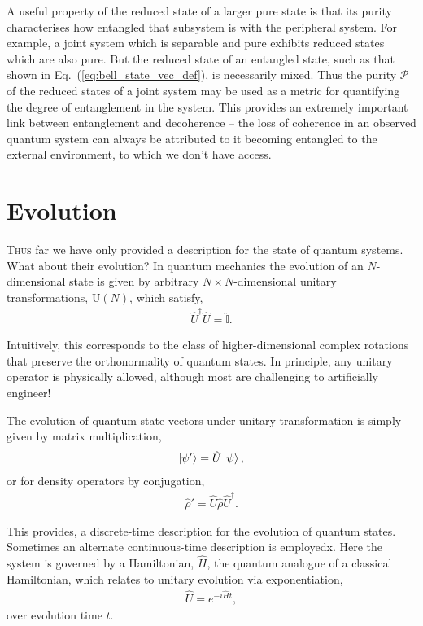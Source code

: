 \documentclass[aps,pra,twocolumn,amsmath,amssymb,nofootinbib,superscriptaddress]{revtex4}
\newcommand{\dropcap}[2]{\lettrine[lines=2, findent=3pt, nindent=0pt]{#1}{#2}}
\begin{document}
A useful property of the reduced state of a larger pure state is that its purity characterises how entangled that subsystem is with the peripheral system. For example, a joint system which is separable and pure exhibits reduced states which are also pure. But the reduced state of an entangled state, such as that shown in Eq.~(\ref{eq:bell_state_vec_def}), is necessarily mixed. Thus the purity $\mathcal{P}$ of the reduced states of a joint system may be used as a metric for quantifying the degree of entanglement in the system. This provides an extremely important link between entanglement and decoherence -- the loss of coherence in an observed quantum system can always be attributed to it becoming entangled to the external environment, to which we don't have access.

%
%

\section{Evolution}

\dropcap{T}{hus} far we have only provided a description for the state of quantum systems. What about their evolution? In quantum mechanics the evolution of an $N$-dimensional state is given by arbitrary \mbox{$N\times N$}-dimensional unitary transformations, $\mathrm{U}(N)$, which satisfy,
\begin{align}
\hat{U}^\dag\hat{U}=\hat{\mathbb{I}}.	
\end{align}

Intuitively, this corresponds to the class of higher-dimensional complex rotations that preserve the orthonormality of quantum states. In principle, any unitary operator is physically allowed, although most are challenging to artificially engineer!

The evolution of quantum state vectors under unitary transformation is simply given by matrix multiplication,
\begin{align}
\ket{\psi'} = \hat{U}\ket\psi,	
\end{align}
or for density operators by conjugation,
\begin{align}
\hat\rho' = \hat{U}\hat\rho\hat{U}^\dag.	
\end{align}

This provides, a discrete-time description for the evolution of quantum states. Sometimes an alternate continuous-time description is employedx. Here the system is governed by a Hamiltonian, $\hat{H}$, the quantum analogue of a classical Hamiltonian, which relates to unitary evolution via exponentiation,
\begin{align}
	\hat{U} = e^{-i\hat{H}t},
\end{align}
over evolution time $t$.
\end{document}

